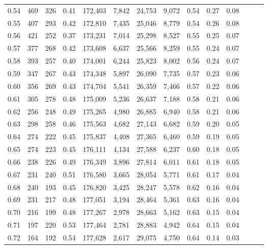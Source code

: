 \begin{tabular}{rrrrrrrrrrrrrr}
0.54 &     469 &  326 &  0.41 &  172,403 &    7,842 &  24,753 &   9,072 &  0.54 &  0.27 &      0.08 \\
0.55 &     407 &  293 &  0.42 &  172,810 &    7,435 &  25,046 &   8,779 &  0.54 &  0.26 &      0.08 \\
0.56 &     421 &  252 &  0.37 &  173,231 &    7,014 &  25,298 &   8,527 &  0.55 &  0.25 &      0.07 \\
0.57 &     377 &  268 &  0.42 &  173,608 &    6,637 &  25,566 &   8,259 &  0.55 &  0.24 &      0.07 \\
0.58 &     393 &  257 &  0.40 &  174,001 &    6,244 &  25,823 &   8,002 &  0.56 &  0.24 &      0.07 \\
0.59 &     347 &  267 &  0.43 &  174,348 &    5,897 &  26,090 &   7,735 &  0.57 &  0.23 &      0.06 \\
0.60 &     356 &  269 &  0.43 &  174,704 &    5,541 &  26,359 &   7,466 &  0.57 &  0.22 &      0.06 \\
0.61 &     305 &  278 &  0.48 &  175,009 &    5,236 &  26,637 &   7,188 &  0.58 &  0.21 &      0.06 \\
0.62 &     256 &  248 &  0.49 &  175,265 &    4,980 &  26,885 &   6,940 &  0.58 &  0.21 &      0.06 \\
0.63 &     298 &  258 &  0.46 &  175,563 &    4,682 &  27,143 &   6,682 &  0.59 &  0.20 &      0.05 \\
0.64 &     274 &  222 &  0.45 &  175,837 &    4,408 &  27,365 &   6,460 &  0.59 &  0.19 &      0.05 \\
0.65 &     274 &  223 &  0.45 &  176,111 &    4,134 &  27,588 &   6,237 &  0.60 &  0.18 &      0.05 \\
0.66 &     238 &  226 &  0.49 &  176,349 &    3,896 &  27,814 &   6,011 &  0.61 &  0.18 &      0.05 \\
0.67 &     231 &  240 &  0.51 &  176,580 &    3,665 &  28,054 &   5,771 &  0.61 &  0.17 &      0.04 \\
0.68 &     240 &  193 &  0.45 &  176,820 &    3,425 &  28,247 &   5,578 &  0.62 &  0.16 &      0.04 \\
0.69 &     231 &  217 &  0.48 &  177,051 &    3,194 &  28,464 &   5,361 &  0.63 &  0.16 &      0.04 \\
0.70 &     216 &  199 &  0.48 &  177,267 &    2,978 &  28,663 &   5,162 &  0.63 &  0.15 &      0.04 \\
0.71 &     197 &  220 &  0.53 &  177,464 &    2,781 &  28,883 &   4,942 &  0.64 &  0.15 &      0.04 \\
0.72 &     164 &  192 &  0.54 &  177,628 &    2,617 &  29,075 &   4,750 &  0.64 &  0.14 &      0.03 \\

\end{tabular}
